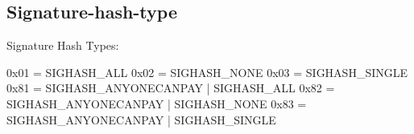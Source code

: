 \subsection{Signature-hash-type}


Signature Hash Types:

0x01 = SIGHASH\_ALL
0x02 = SIGHASH\_NONE
0x03 = SIGHASH\_SINGLE
0x81 = SIGHASH\_ANYONECANPAY | SIGHASH\_ALL
0x82 = SIGHASH\_ANYONECANPAY | SIGHASH\_NONE
0x83 = SIGHASH\_ANYONECANPAY | SIGHASH\_SINGLE